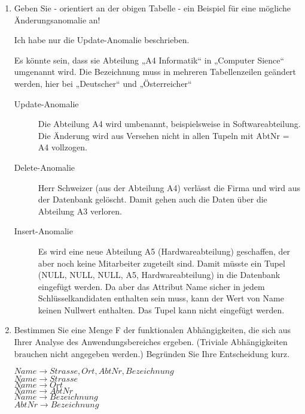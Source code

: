 \documentclass{lehramt-informatik}
\begin{document}
\renewcommand{\labelenumi}{(\alph{enumi})}
\begin{enumerate}


\item Geben Sie - orientiert an der obigen Tabelle - ein Beispiel für
eine mögliche Änderungsanomalie an!

Ich habe nur die Update-Anomalie beschrieben.

\begin{antwort}[falsch]
Es könnte sein, dass sie Abteilung „A4 Informatik“ in „Computer Sience“
umgenannt wird. Die Bezeichnung muss in mehreren Tabellenzeilen
geändert werden, hier bei „Deutscher“ und „Österreicher“
\end{antwort}

\begin{antwort}[muster]
\begin{description}
\item[Update-Anomalie] Die Abteilung A4 wird umbenannt, beispielsweise
in Softwareabteilung. Die Änderung wird aus Versehen nicht in allen
Tupeln mit AbtNr = A4 vollzogen.

\item[Delete-Anomalie] Herr Schweizer (aus der Abteilung A4) verlässt
die Firma und wird aus der Datenbank gelöscht. Damit gehen auch die
Daten über die Abteilung A3 verloren.

\item[Insert-Anomalie] Es wird eine neue Abteilung A5
(Hardwareabteilung) geschaffen, der aber noch keine Mitarbeiter
zugeteilt sind. Damit müsste ein Tupel (NULL, NULL, NULL, A5,
Hardwareabteilung) in die Datenbank eingefügt werden. Da aber das
Attribut Name sicher in jedem Schlüsselkandidaten enthalten sein muss,
kann der Wert von Name keinen Nullwert enthalten. Das Tupel kann nicht
eingefügt werden.
\end{description}
\end{antwort}


\item Bestimmen Sie eine Menge F der funktionalen Abhängigkeiten, die
sich aus Ihrer Analyse des Anwendungsbereiches ergeben. (Triviale
Abhängigkeiten brauchen nicht angegeben werden.) Begründen Sie Ihre
Entscheidung kurz.

\begin{antwort}[falsch]
$Name \rightarrow Strasse, Ort, AbtNr, Bezeichnung$ \\
$Name \rightarrow Strasse$ \\
$Name \rightarrow Ort$ \\
$Name \rightarrow AbtNr$ \\
$Name \rightarrow Bezeichnung$ \\
$AbtNr \rightarrow Bezeichnung$
\end{antwort}


\end{enumerate}
\end{document}
